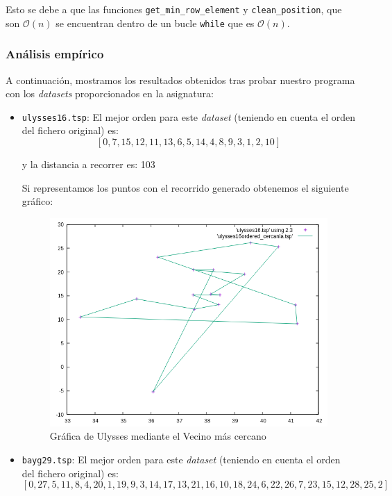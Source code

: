 \documentclass[10pt,a4paper]{article}
\begin{document}
Esto se debe a que las funciones \texttt{get\_min\_row\_element} y \texttt{clean\_position}, que son \(\mathcal{O}(n)\) se encuentran dentro de un bucle \texttt{while} que es \(\mathcal{O}(n)\).

\subsubsection*{Análisis empírico}
A continuación, mostramos los resultados obtenidos tras probar nuestro programa con los \textit{datasets} proporcionados en la asignatura:

\begin{itemize}
	\item \texttt{ulysses16.tsp}: El mejor orden para este \textit{dataset} (teniendo en cuenta el orden del fichero original) es:
	\[
		[0,7,15,12,11,13,6,5,14,4,8,9,3,1,2,10]
	\]
	
	y la distancia a recorrer es: 103
	
	Si representamos los puntos con el recorrido generado obtenemos el siguiente gráfico:
	
	\begin{figure}[h!]
	\centering
	\includegraphics[scale=0.5]{./Images/ulysses_cercania.png}
	\caption{Gráfica de Ulysses mediante el Vecino más cercano}
	\end{figure}
	
	\item \texttt{bayg29.tsp}: El mejor orden para este \textit{dataset} (teniendo en cuenta el orden del fichero original) es:
	\[
		[0,27,5,11,8,4,20,1,19,9,3,14,17,13,21,16,10,18,24,6,22,26,7,23,15,12,28,25,2]
	\]
	

\end{itemize}
\end{document}
